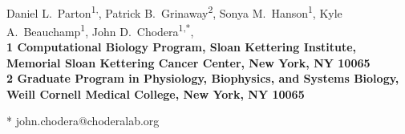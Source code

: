 \documentclass[10pt,letterpaper]{article}
\date{}
\begin{document}
\vspace*{0.35in}

\begin{flushleft}
{\Large
\textbf{}
}
\newline
\\
Daniel L.~Parton\textsuperscript{1,},
Patrick B.~Grinaway\textsuperscript{2},
Sonya M.~Hanson\textsuperscript{1},
Kyle A.~Beauchamp\textsuperscript{1},
John D.~Chodera\textsuperscript{1,*},
\\
\bigskip
\bf{1} Computational Biology Program, Sloan Kettering Institute, Memorial Sloan Kettering Cancer Center, New York, NY 10065
\\
\bf{2} Graduate Program in Physiology, Biophysics, and Systems Biology, Weill Cornell Medical College, New York, NY 10065
\\
\bigskip

% 
%

* john.chodera@choderalab.org

\end{flushleft}
\end{document}
